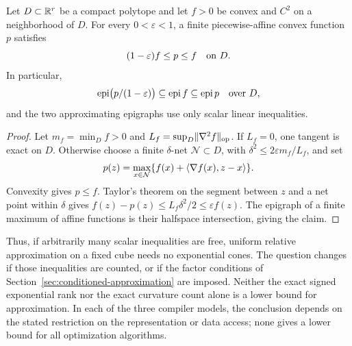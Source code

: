 \begin{proposition}
\label{prop:exp-polyhedral-approximation}
Let $D\subset\mathbb R^r$ be a compact polytope and let $f>0$ be convex and
$C^2$ on a neighborhood of $D$. For every $0<\varepsilon<1$, a finite
piecewise-affine convex function $p$ satisfies
\[
 (1-\varepsilon)f\leq p\leq f\quad\hbox{on }D.
\]
In particular,
\[
 \operatorname{epi}\bigl(p/(1-\varepsilon)\bigr)
 \subseteq\operatorname{epi} f\subseteq\operatorname{epi}p
 \quad\hbox{over }D,
\]
and the two approximating epigraphs use only scalar linear inequalities.
\end{proposition}
\begin{proof}
Let $m_f=\min_D f>0$ and $L_f=\sup_D\lVert \nabla^2 f\rVert_{\mathrm{op}}$.
If $L_f=0$, one tangent is exact on $D$. Otherwise choose a finite
$\delta$-net $\mathcal N\subset D$, with
$\delta^2\leq2\varepsilon m_f/L_f$, and set
\[
 p(z)=\max_{x\in\mathcal N}
          \{f(x)+\langle \nabla f(x),z-x\rangle\}.
\]
Convexity gives $p\leq f$. Taylor's theorem on the segment between $z$
and a net point within $\delta$ gives
$f(z)-p(z)\leq L_f\delta^2/2\leq\varepsilon f(z)$.
The epigraph of a finite maximum of affine functions is their halfspace
intersection, giving the claim.
\end{proof}

Thus, if arbitrarily many scalar inequalities are free, uniform
relative approximation on a fixed cube needs no exponential cones. The
question changes if those inequalities are counted, or if the factor
conditions of Section~\ref{sec:conditioned-approximation} are imposed.
Neither the exact signed exponential rank nor the exact curvature count
alone is a lower bound for approximation. In each of the three compiler
models, the conclusion depends on the stated restriction on the
representation or data access; none gives a lower bound for all
optimization algorithms.
